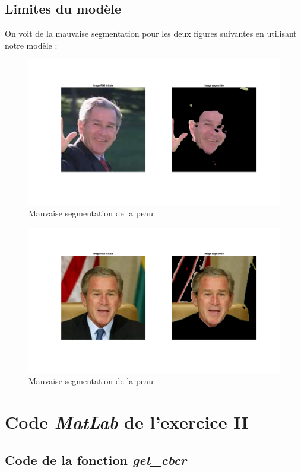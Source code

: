 \documentclass[11pt,a4paper]{article}
\begin{document}
\newpage
\subsection{Limites du modèle}
\label{an.lim}
On voit de la mauvaise segmentation pour les deux figures suivantes en utilisant notre modèle :

\begin{figure}[H]
\center
\includegraphics[width=12cm]{exo2_image_seg_limit1.png}
\caption{Mauvaise segmentation de la peau}
\end{figure} 

\begin{figure}[H]
\center
\includegraphics[width=12cm]{exo2_image_seg_limit2.png}
\caption{Mauvaise segmentation de la peau}
\end{figure} 

\newpage
\section{Code \emph{MatLab} de l'exercice II}

\subsection{Code de la fonction \emph{get\_cbcr}}
\end{document}
